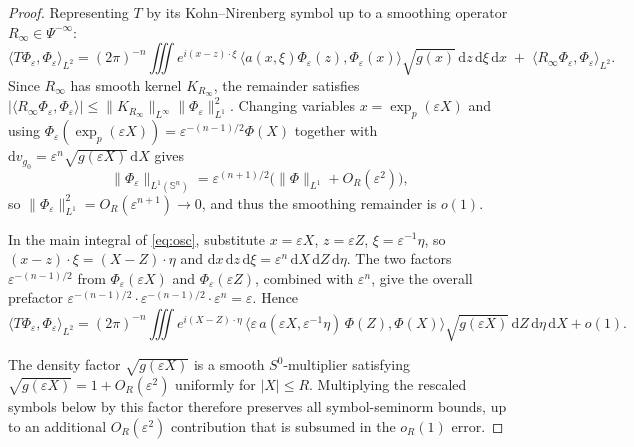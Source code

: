 \documentclass[a4paper, 12pt]{article}
\begin{document}
\begin{proof}
	Representing $T$ by its Kohn--Nirenberg symbol up to a smoothing operator
	$R_\infty \in \Psi^{-\infty}$:
	\begin{equation}\label{eq:osc}
		\langle T\Phi_\varepsilon,\Phi_\varepsilon\rangle_{L^2}
		= (2\pi)^{-n}
		\iiint
		e^{i(x-z)\cdot\xi}\,
		\bigl\langle a(x,\xi)\Phi_\varepsilon(z),\Phi_\varepsilon(x)\bigr\rangle
		\sqrt{g(x)}\,\mathrm{d}z\,\mathrm{d}\xi\,\mathrm{d}x
		\;+\; \langle R_\infty\Phi_\varepsilon,\Phi_\varepsilon\rangle_{L^2}.
	\end{equation}
	Since $R_\infty$ has smooth kernel $K_{R_\infty}$, the remainder satisfies
	$|\langle R_\infty\Phi_\varepsilon,\Phi_\varepsilon\rangle|
	\le \|K_{R_\infty}\|_{L^\infty}\|\Phi_\varepsilon\|_{L^1}^2$.
	Changing variables $x = \exp_p(\varepsilon X)$ and using
	$\Phi_\varepsilon(\exp_p(\varepsilon X)) = \varepsilon^{-(n-1)/2}\Phi(X)$
	together with $\mathrm{d}v_{g_0} = \varepsilon^n\sqrt{g(\varepsilon X)}\,\mathrm{d}X$
	gives
	\[
	\|\Phi_\varepsilon\|_{L^1(\mathbb{S}^n)}
	= \varepsilon^{(n+1)/2}\bigl(\|\Phi\|_{L^1} + O_R(\varepsilon^2)\bigr),
	\]
	so $\|\Phi_\varepsilon\|_{L^1}^2 = O_R(\varepsilon^{n+1}) \to 0$, and thus
	the smoothing remainder is $o(1)$.
	
	In the main integral of \eqref{eq:osc}, substitute $x = \varepsilon X$,
	$z = \varepsilon Z$, $\xi = \varepsilon^{-1}\eta$, so
	$(x-z)\cdot\xi = (X-Z)\cdot\eta$ and
	$\mathrm{d}x\,\mathrm{d}z\,\mathrm{d}\xi = \varepsilon^n\,\mathrm{d}X\,\mathrm{d}Z\,\mathrm{d}\eta$.
	The two factors $\varepsilon^{-(n-1)/2}$ from $\Phi_\varepsilon(\varepsilon X)$
	and $\Phi_\varepsilon(\varepsilon Z)$, combined with $\varepsilon^n$, give the
	overall prefactor $\varepsilon^{-(n-1)/2}\cdot\varepsilon^{-(n-1)/2}\cdot
	\varepsilon^n = \varepsilon$. Hence
	\begin{equation}\label{eq:rescaled}
		\langle T\Phi_\varepsilon,\Phi_\varepsilon\rangle_{L^2}
		= (2\pi)^{-n}
		\iiint
		e^{i(X-Z)\cdot\eta}\,
		\bigl\langle
		\varepsilon\,a(\varepsilon X,\varepsilon^{-1}\eta)\,\Phi(Z),
		\Phi(X)
		\bigr\rangle
		\sqrt{g(\varepsilon X)}\,\mathrm{d}Z\,\mathrm{d}\eta\,\mathrm{d}X
		+ o(1).
	\end{equation}
	
	The density factor $\sqrt{g(\varepsilon X)}$ is a smooth $S^0$-multiplier
	satisfying $\sqrt{g(\varepsilon X)} = 1 + O_R(\varepsilon^2)$ uniformly for
	$|X| \le R$. Multiplying the rescaled symbols below by this factor therefore
	preserves all symbol-seminorm bounds, up to an additional $O_R(\varepsilon^2)$
	contribution that is subsumed in the $o_R(1)$ error.
	

\end{proof}
\end{document}
